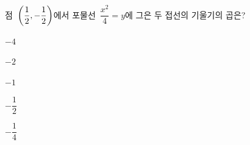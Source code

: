 점~$\left(\dfrac{1}{2}{,}\mkern3mu\mathopen{}-\dfrac{1}{2}\right)$에서 포물선~$\dfrac{x^2}{4}=y$에 그은 두 접선의 기울기의 곱은?
\begin{choices32}{\rule[-3ex]{0pt}{8ex}$-4$}{\rule[-3ex]{0pt}{8ex}$-2$}{\rule[-3ex]{0pt}{8ex}$-1$}{\rule[-3ex]{0pt}{8ex}$-\dfrac{1}{2}$}{\rule[-3ex]{0pt}{8ex}$-\dfrac{1}{4}$}\end{choices32}
